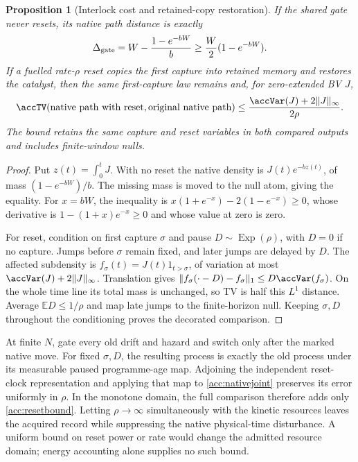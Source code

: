 \documentclass[11pt,oneside,openany]{book}
\newtheorem{proposition}[theorem]{Proposition}
\theoremstyle{definition}
\theoremstyle{remark}\newtheorem{remark}[theorem]{Remark}
\begin{document}
\begin{proposition}[Interlock cost and retained-copy restoration]\label{acc:reset}
If the shared gate never resets, its native path distance is exactly
\begin{equation}
 \Delta_{
\rm gate}=W-\frac{1-e^{-bW}}{b}
 \ge\frac W2(1-e^{-bW}).
 \label{acc:gatecost}
\end{equation}
If a fuelled rate-$\rho$ reset copies the first capture into retained
memory and restores the catalyst, then the same first-capture law remains
and, for zero-extended BV $J$,
\begin{equation}
 \accTV(\text{native path with reset},\text{original native path})
 \le\frac{\accVar(J)+2\|J\|_\infty}{2\rho}.
 \label{acc:resetbound}
\end{equation}
The bound retains the same capture and reset variables in both compared
outputs and includes finite-window nulls.
\end{proposition}
\begin{proof}
Put $z(t)=\int_0^tJ$. With no reset the native density is
$J(t)e^{-bz(t)}$, of mass $(1-e^{-bW})/b$. The missing mass is moved to
the null atom, giving the equality. For $x=bW$, the inequality is
$x(1+e^{-x})-2(1-e^{-x})\ge0$, whose derivative is
$1-(1+x)e^{-x}\ge0$ and whose value at zero is zero.

For reset, condition on first capture $\sigma$ and pause
$D\sim\operatorname{Exp}(\rho)$, with $D=0$ if no capture. Jumps before
$\sigma$ remain fixed, and later jumps are delayed by $D$.
The affected subdensity is $f_\sigma(t)=J(t)1_{t>\sigma}$, of variation
at most $\accVar(J)+2\|J\|_\infty$. Translation gives
$\|f_\sigma(\cdot-D)-f_\sigma\|_1\le D\accVar(f_\sigma)$.
On the whole time line its total mass is unchanged, so TV is half this
$L^1$ distance. Average $\mathbb ED\le1/\rho$ and map late jumps to the
finite-horizon null. Keeping $\sigma,D$ throughout the conditioning proves
the decorated comparison.
\end{proof}

At finite $N$, gate every old drift and hazard and switch only after the
marked native move. For fixed $\sigma,D$, the resulting process is exactly
the old process under its measurable paused programme-age map. Adjoining
the independent reset-clock representation and applying that map to
\eqref{acc:nativejoint} preserves its error uniformly in $\rho$.
In the monotone domain, the full comparison therefore adds only
\eqref{acc:resetbound}. Letting $\rho\to\infty$ simultaneously with the
kinetic resources leaves the acquired record while suppressing the native
physical-time disturbance. A uniform bound on reset power or rate would
change the admitted resource domain; energy accounting alone supplies no
such bound.
\end{document}
